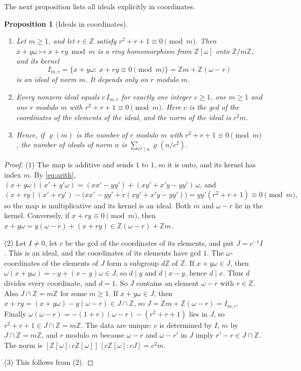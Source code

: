 \documentclass[11pt]{article}
\numberwithin{equation}{section}
\newcommand{\OO}{\mathbb Z[\omega]}
\newcommand{\Z}{\mathbb Z}
\newtheorem{proposition}[theorem]{Proposition}
\theoremstyle{definition}
\theoremstyle{remark}
\begin{document}
The next proposition lists all ideals explicitly in coordinates.

\begin{proposition}[Ideals in coordinates]\label{prop:idealcoords}
\begin{enumerate}
\item Let $m\ge1$, and let $r\in\Z$ satisfy $r^2+r+1\equiv0\pmod m$. Then $x+y\omega\mapsto x+ry\bmod m$ is a
ring homomorphism from $\OO$ onto $\Z/m\Z$, and its kernel
\begin{equation}\label{eq:Imr}
 I_{m,r}=\{x+y\omega:\ x+ry\equiv0\pmod m\}=\Z m+\Z(\omega-r)
\end{equation}
is an ideal of norm $m$. It depends only on $r$ modulo $m$.
\item Every nonzero ideal equals $c\,I_{m,r}$ for exactly one integer $c\ge1$, one $m\ge1$ and one $r$ modulo
$m$ with $r^2+r+1\equiv0\pmod m$. Here $c$ is the gcd of the coordinates of the elements of the ideal, and the
norm of the ideal is $c^2m$.
\item Hence, if $\varrho(m)$ is the number of $r$ modulo $m$ with $r^2+r+1\equiv0\pmod m$, the number of ideals
of norm $n$ is $\sum_{c^2\mid n}\varrho(n/c^2)$.
\end{enumerate}
\end{proposition}

\begin{proof}
(1) The map is additive and sends $1$ to $1$, so it is onto, and its kernel has index $m$. By
\eqref{eq:arith}, $(x+y\omega)(x'+y'\omega)=(xx'-yy')+(xy'+x'y-yy')\,\omega$, and
\begin{equation}\label{eq:homcheck}
 (x+ry)(x'+ry')-\bigl(xx'-yy'+r(xy'+x'y-yy')\bigr)=yy'(r^2+r+1)\equiv0\pmod m,
\end{equation}
so the map is multiplicative and its kernel is an ideal. Both $m$ and $\omega-r$ lie in the kernel. Conversely,
if $x+ry\equiv0\pmod m$, then $x+y\omega=y(\omega-r)+(x+ry)\in\Z(\omega-r)+\Z m$.

(2) Let $I\ne0$, let $c$ be the gcd of the coordinates of its elements, and put $J=c^{-1}I$. This is an
ideal, and the coordinates of its elements have gcd $1$. The $\omega$-coordinates of the elements of $J$
form a subgroup $d\Z$ of $\Z$. If $x+y\omega\in J$, then $\omega(x+y\omega)=-y+(x-y)\omega\in J$, so $d\mid y$
and $d\mid x-y$, hence $d\mid x$. Thus $d$ divides every coordinate, and $d=1$. So $J$ contains an element
$\omega-r$ with $r\in\Z$. Also $J\cap\Z=m\Z$ for some $m\ge1$. If $x+y\omega\in J$, then
$x+ry=(x+y\omega)-y(\omega-r)\in J\cap\Z$, so $J=\Z m+\Z(\omega-r)=I_{m,r}$. Finally
$\omega(\omega-r)=-(1+r)(\omega-r)-(r^2+r+1)$ lies in $J$, so $r^2+r+1\in J\cap\Z=m\Z$. The data are
unique: $c$ is determined by $I$, $m$ by $J\cap\Z=m\Z$, and $r$ modulo $m$ because $\omega-r$ and
$\omega-r'$ in $J$ imply $r'-r\in J\cap\Z$. The norm is $[\OO:c\OO]\,[c\OO:cJ]=c^2m$.

(3) This follows from (2).
\end{proof}
\end{document}
